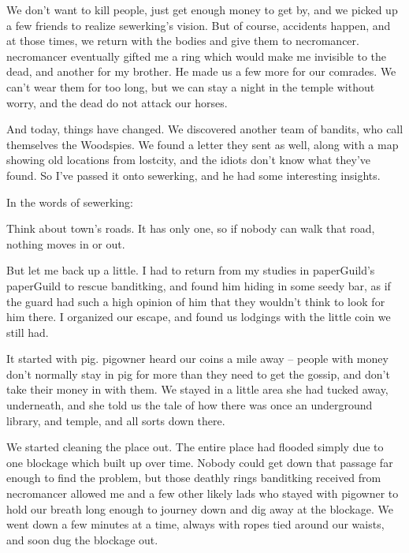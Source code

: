 \begin{multicols}{2}
\begin{exampletext}
  We don't want to kill people, just get enough money to get by, and we picked up a few friends to realize \gls{sewerking}'s vision.
  But of course, accidents happen, and at those times, we return with the bodies and give them to \gls{necromancer}.
  \Gls{necromancer} eventually gifted me a ring which would make me invisible to the dead, and another for my brother.
  He made us a few more for our comrades.
  We can't wear them for too long, but we can stay a night in the temple without worry, and the dead do not attack our horses.

  And today, things have changed.
  We discovered another team of bandits, who call themselves the Woodspies.
  We found a letter they sent as well, along with a map showing old locations from \gls{lostcity}, and the idiots don't know what they've found.
  So I've passed it onto \gls{sewerking}, and he had some interesting insights.

\end{exampletext}

In the words of \gls{sewerking}:
\label{blightConspiracy}

\begin{exampletext}

  Think about \gls{town}'s roads.
  It has only one, so if nobody can walk that road, nothing moves in or out.

  But let me back up a little.
  I had to return from my studies in \gls{paperGuild}'s \gls{paperGuild} to rescue \gls{banditking}, and found him hiding in some seedy bar, as if the \gls{guard} had such a high opinion of him that they wouldn't think to look for him there.
  I organized our escape, and found us lodgings with the little coin we still had.

  It started with \gls{pig}.
  \Gls{pigowner} heard our coins a mile away -- people with money don't normally stay in \gls{pig} for more than they need to get the gossip, and don't take their money in with them.
  We stayed in a little area she had tucked away, underneath, and she told us the tale of how there was once an underground library, and temple, and all sorts down there.

  We started cleaning the place out.
  The entire place had flooded simply due to one blockage which built up over time.
  Nobody could get down that passage far enough to find the problem, but those deathly rings \gls{banditking} received from \gls{necromancer} allowed me and a few other likely lads who stayed with \gls{pigowner} to hold our breath long enough to journey down and dig away at the blockage.
  We went down a few minutes at a time, always with ropes tied around our waists, and soon dug the blockage out.


\end{exampletext}
\end{multicols}

